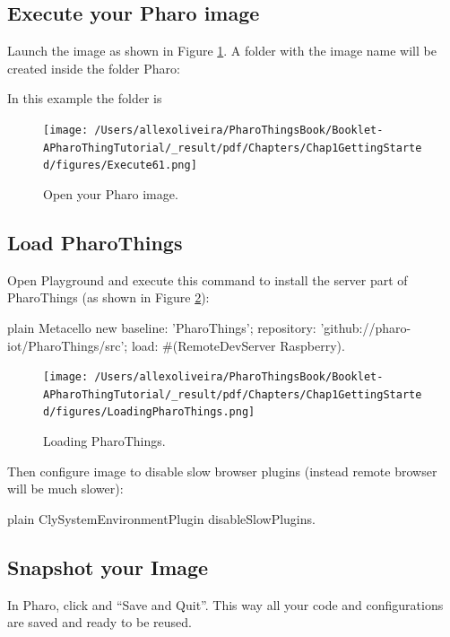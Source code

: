 \documentclass[10pt,twoside,english]{_support/latex/sbabook/sbabook}
\begin{document}
\subsection{Execute your Pharo image}
Launch the image as shown in Figure \ref{Execute61}. A folder with the image name will be created inside the folder Pharo:  

In this example the folder is  


\begin{figure}

\begin{center}
\texttt{[image: /Users/allexoliveira/PharoThingsBook/Booklet-APharoThingTutorial/\_result/pdf/Chapters/Chap1GettingStarted/figures/Execute61.png]}\caption{Open your Pharo image.\label{Execute61}}\end{center}
\end{figure}

\subsection{Load PharoThings}
Open Playground and execute this command to install the server part of PharoThings (as shown in Figure \ref{LoadingPharoThings}):

\begin{displaycode}{plain}
Metacello new
	baseline: 'PharoThings';
	repository: 'github://pharo-iot/PharoThings/src';
	load: #(RemoteDevServer Raspberry).
\end{displaycode}


\begin{figure}

\begin{center}
\texttt{[image: /Users/allexoliveira/PharoThingsBook/Booklet-APharoThingTutorial/\_result/pdf/Chapters/Chap1GettingStarted/figures/LoadingPharoThings.png]}\caption{Loading PharoThings.\label{LoadingPharoThings}}\end{center}
\end{figure}


Then configure image to disable slow browser plugins (instead remote browser will be much slower):

\begin{displaycode}{plain}
ClySystemEnvironmentPlugin disableSlowPlugins.
\end{displaycode}
\subsection{Snapshot your Image}
 In Pharo, click and “Save and Quit”. This way all your code and configurations are saved and ready to be reused.
 
\end{document}
